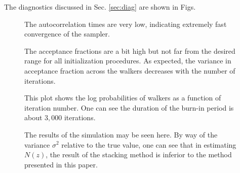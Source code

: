 \documentclass[preprint]{aastex}
\begin{document}




The diagnostics discussed in Sec. \ref{sec:diag} are shown in Figs. %

\begin{figure}
\caption{The autocorrelation times are very low, indicating extremely fast convergence of the sampler.}
\label{fig:realacor}
\end{figure}

\begin{figure}
\caption{The acceptance fractions are a bit high but not far from the desired range for all initialization procedures.  As expected, the variance in acceptance fraction across the walkers decreases with the number of iterations.}
\label{fig:realfrac}
\end{figure}

\begin{figure}
\caption{This plot shows the log probabilities of walkers as a function of iteration number.  One can see the duration of the burn-in period is about $3,000$ iterations.}
\label{fig:realprob}
\end{figure}

\begin{figure}
\caption{The results of the simulation may be seen here.  By way of the variance $\sigma^{2}$ relative to the true value, one can see that in estimating $N(z)$, the result of the stacking method is inferior to the method presented in this paper.}
\label{fig:realparam}
\end{figure}
\end{document}
